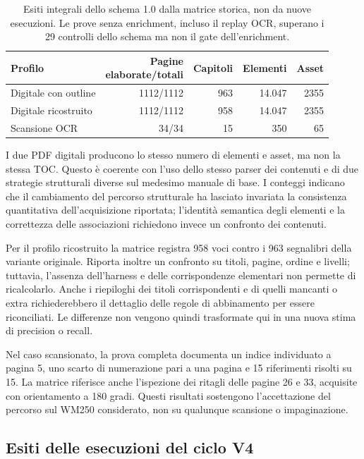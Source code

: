 \begin{table}[!htbp]
\centering
\caption{Esiti integrali dello schema 1.0 dalla matrice storica, non da nuove esecuzioni. Le prove senza enrichment, incluso il replay OCR, superano i 29 controlli dello schema ma non il gate dell'enrichment.}
\label{tab:risultati-storici}
\small
\begin{tabularx}{\textwidth}{@{}>{\raggedright\arraybackslash}Xrrrr@{}}
\toprule
Profilo & \shortstack{Pagine\\elaborate/totali} & Capitoli & Elementi & Asset \tabularnewline
\midrule
Digitale con outline & 1112/1112 & 963 & 14.047 & 2355 \\
Digitale ricostruito & 1112/1112 & 958 & 14.047 & 2355 \\
Scansione OCR & 34/34 & 15 & 350 & 65 \\
\bottomrule
\end{tabularx}
\end{table}

I due PDF digitali producono lo stesso numero di elementi e asset, ma non la stessa TOC. Questo è coerente con l'uso dello stesso parser dei contenuti e di due strategie strutturali diverse sul medesimo manuale di base. I conteggi indicano che il cambiamento del percorso strutturale ha lasciato invariata la consistenza quantitativa dell'acquisizione riportata; l'identità semantica degli elementi e la correttezza delle associazioni richiedono invece un confronto dei contenuti.

Per il profilo ricostruito la matrice registra 958 voci contro i 963 segnalibri della variante originale. Riporta inoltre un confronto su titoli, pagine, ordine e livelli; tuttavia, l'assenza dell'harness e delle corrispondenze elementari non permette di ricalcolarlo. Anche i riepiloghi dei titoli corrispondenti e di quelli mancanti o extra richiederebbero il dettaglio delle regole di abbinamento per essere riconciliati. Le differenze non vengono quindi trasformate qui in una nuova stima di precision o recall.

Nel caso scansionato, la prova completa documenta un indice individuato a pagina 5, uno scarto di numerazione pari a una pagina e 15 riferimenti risolti su 15. La matrice riferisce anche l'ispezione dei ritagli delle pagine 26 e 33, acquisite con orientamento a 180 gradi. Questi risultati sostengono l'accettazione del percorso sul WM250 considerato, non su qualunque scansione o impaginazione.

\subsection{Esiti delle esecuzioni del ciclo V4}

